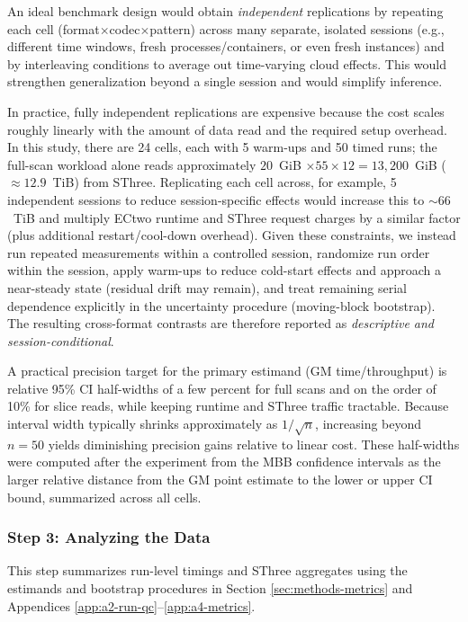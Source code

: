 \documentclass[nomenclature, english, bibtex]{kththesis}
\numberwithin{listing}{chapter}
\begin{document}
An ideal benchmark design would obtain \emph{independent} replications by repeating each cell (format$\times$codec$\times$pattern) across many separate, isolated sessions (e.g., different time windows, fresh processes/containers, or even fresh instances) and by interleaving conditions to average out time-varying cloud effects. This would strengthen generalization beyond a single session and would simplify inference.

In practice, fully independent replications are expensive because the cost scales roughly linearly with the amount of data read and the required setup overhead. In this study, there are 24 cells, each with 5 warm-ups and 50 timed runs; the full-scan workload alone reads approximately $20$~GiB $\times 55 \times 12 = 13{,}200$~GiB ($\approx 12.9$~TiB) from \gls{SThree}. Replicating each cell across, for example, 5 independent sessions to reduce session-specific effects would increase this to $\sim 66$~TiB and multiply \gls{ECtwo} runtime and \gls{SThree} request charges by a similar factor (plus additional restart/cool-down overhead). Given these constraints, we instead run repeated measurements within a controlled session, randomize run order within the session, apply warm-ups to reduce cold-start effects and approach a near-steady state (residual drift may remain), and treat remaining serial dependence explicitly in the uncertainty procedure (moving-block bootstrap). The resulting cross-format contrasts are therefore reported as \emph{descriptive and session-conditional}.

A practical precision target for the primary estimand (\gls{GM} time/throughput) is relative 95\% \gls{CI} half-widths of a few percent for full scans and on the order of 10\% for slice reads, while keeping runtime and \gls{SThree} traffic tractable. Because interval width typically shrinks approximately as $1/\sqrt{n}$, increasing beyond $n=50$ yields diminishing precision gains relative to linear cost. These half-widths were computed after the experiment from the \gls{MBB} confidence intervals as the larger relative distance from the \gls{GM} point estimate to the lower or upper \gls{CI} bound, summarized across all cells.

\subsubsection{Step 3: Analyzing the Data}
This step summarizes run-level timings and \gls{SThree} aggregates using the estimands and bootstrap procedures in Section \ref{sec:methods-metrics} and Appendices \ref{app:a2-run-qc}–\ref{app:a4-metrics}.
\end{document}

